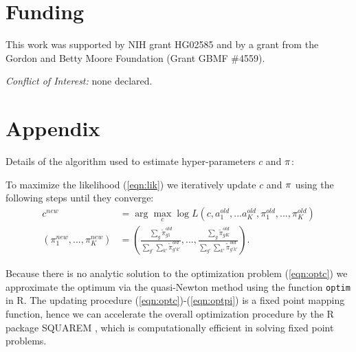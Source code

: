 \documentclass{bioinfo}
\begin{document}
\section*{Funding}
This work was supported by NIH grant HG02585 and 
by a grant from the Gordon and Betty Moore Foundation (Grant GBMF \#4559).

\noindent \emph{Conflict of Interest:} none declared.


%


%

 
\nocite{*}

\section*{Appendix}
Details of the algorithm used to estimate hyper-parameters $c$ and $\mathbf \pi$: 

To maximize the likelihood (\ref{eqn:lik})
we iteratively update $c$ and $\mathbf \pi$ using the following steps until they converge:
\begin{align}
c^{new}&=\arg\max_{c} \log L(c,a_1^{old},...a_K^{old},\pi_1^{old},...,\pi_K^{old}) \label{eqn:optc} \\
(\pi_1^{new},...,\pi_K^{new})&=\left(\frac{\sum_g \tilde{\pi}_{g1}^{old}}{\sum_{g'}\sum_{k'} \tilde{\pi}_{g'k'}^{old}},...,\frac{\sum_g \tilde{\pi}_{gK}^{old}}{\sum_{g'}\sum_{k'} \tilde{\pi}_{g'k'}^{old}}\right). \label{eqn:optpi}
\end{align}

Because there is no analytic solution to the optimization problem (\ref{eqn:optc}) we approximate the optimum via the quasi-Newton method
using the function {\tt optim} in R. The updating procedure (\ref{eqn:optc})-(\ref{eqn:optpi}) is a fixed point mapping function, hence we can accelerate the overall optimization procedure by the R package SQUAREM \citep{varadhan2010squarem}, which is computationally efficient in solving fixed point problems. 
\end{document}
